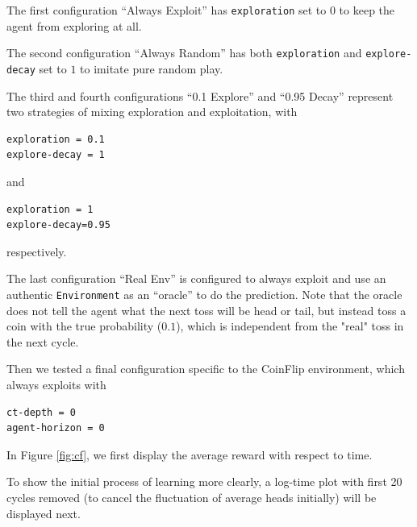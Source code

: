 \documentclass{article}
\begin{document}
\begin{flushleft}
The first configuration “Always Exploit”
has \verb|exploration| set to $0$
to keep the agent from exploring at all.

The second configuration “Always Random”
has both \verb|exploration|
and \verb|explore-decay| set to $1$
to imitate pure random play.

The third and fourth configurations “0.1 Explore”
and “0.95 Decay”
represent two strategies of mixing exploration and
exploitation, with
\begin{verbatim}
exploration = 0.1
explore-decay = 1
\end{verbatim}
and
\begin{verbatim}
exploration = 1
explore-decay=0.95
\end{verbatim}
respectively.

The last configuration “Real Env” 
is configured to always exploit and use
an authentic \verb|Environment| as 
an “oracle” to do
the prediction.
Note that the oracle does not tell 
the agent what the next toss will
be head or tail, but instead toss a coin
with the true probability ($0.1$),
which is independent from the
"real" toss in the next cycle.

Then we tested a final configuration specific
to the CoinFlip environment,
which always exploits with 
\begin{verbatim}
ct-depth = 0
agent-horizon = 0
\end{verbatim}

\begin{figure}

\end{figure}

In Figure \ref{fig:cf}, we first display the
average reward with respect to time.

To show the initial process of learning more clearly, a log-time plot with
first 20 cycles removed (to cancel the fluctuation of average heads initially) will be displayed next.


\end{flushleft}
\end{document}
